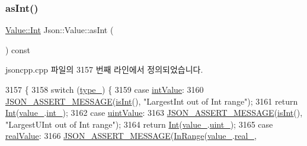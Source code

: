 \subsubsection{\texorpdfstring{as\+Int()}{asInt()}}
{\footnotesize\ttfamily \hyperlink{class_json_1_1_value_abdf7a7ff73eb130ffcab28504ffdb405}{Value\+::\+Int} Json\+::\+Value\+::as\+Int (\begin{DoxyParamCaption}{ }\end{DoxyParamCaption}) const}



jsoncpp.\+cpp 파일의 3157 번째 라인에서 정의되었습니다.


\begin{DoxyCode}
3157                             \{
3158   \textcolor{keywordflow}{switch} (\hyperlink{class_json_1_1_value_abd222c2536dc88bf330dedcd076d2356}{type\_}) \{
3159   \textcolor{keywordflow}{case} \hyperlink{namespace_json_a7d654b75c16a57007925868e38212b4eae5a9d708d5c9e23ae9bf98898522512d}{intValue}:
3160     \hyperlink{json_8h_ad7facdeeca0f495765e3b204c265eadb}{JSON\_ASSERT\_MESSAGE}(\hyperlink{class_json_1_1_value_aff51d8b52979ca06cf9d909accd5f695}{isInt}(), \textcolor{stringliteral}{"LargestInt out of Int range"});
3161     \textcolor{keywordflow}{return} \hyperlink{class_json_1_1_value_abdf7a7ff73eb130ffcab28504ffdb405}{Int}(\hyperlink{class_json_1_1_value_aef578244546212705b9f81eb84d7e151}{value\_}.\hyperlink{union_json_1_1_value_1_1_value_holder_adbfb384301298844ed955ba5cf6015a0}{int\_});
3162   \textcolor{keywordflow}{case} \hyperlink{namespace_json_a7d654b75c16a57007925868e38212b4eaea788d9a3bb00adc6d68d97d43e1ccd3}{uintValue}:
3163     \hyperlink{json_8h_ad7facdeeca0f495765e3b204c265eadb}{JSON\_ASSERT\_MESSAGE}(\hyperlink{class_json_1_1_value_aff51d8b52979ca06cf9d909accd5f695}{isInt}(), \textcolor{stringliteral}{"LargestUInt out of Int range"});
3164     \textcolor{keywordflow}{return} \hyperlink{class_json_1_1_value_abdf7a7ff73eb130ffcab28504ffdb405}{Int}(\hyperlink{class_json_1_1_value_aef578244546212705b9f81eb84d7e151}{value\_}.\hyperlink{union_json_1_1_value_1_1_value_holder_aab65665dc15a24a29a8e93cdeeaa7e50}{uint\_});
3165   \textcolor{keywordflow}{case} \hyperlink{namespace_json_a7d654b75c16a57007925868e38212b4eab837c7b869c14d8be712deb45c9e490e}{realValue}:
3166     \hyperlink{json_8h_ad7facdeeca0f495765e3b204c265eadb}{JSON\_ASSERT\_MESSAGE}(\hyperlink{namespace_json_aff0180507262a244de61b961178d7443}{InRange}(\hyperlink{class_json_1_1_value_aef578244546212705b9f81eb84d7e151}{value\_}.\hyperlink{union_json_1_1_value_1_1_value_holder_af0c5ca724e5fe3a15db773d750e2351e}{real\_}, 

\end{DoxyCode}
